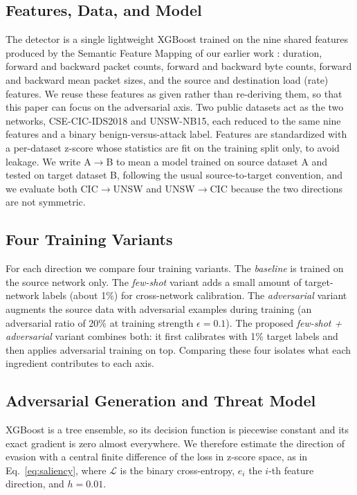 \documentclass[11pt,a4paper]{article}
\begin{document}
\subsection{Features, Data, and Model}
The detector is a single lightweight XGBoost \cite{xgboost} trained on the nine shared
features produced by the Semantic Feature Mapping of our earlier work
\cite{martono2024sfm}: duration, forward and backward packet counts, forward and backward
byte counts, forward and backward mean packet sizes, and the source and destination load
(rate) features. We reuse these features as given rather than re-deriving them, so that
this paper can focus on the adversarial axis. Two public datasets act as the two networks,
CSE-CIC-IDS2018 and UNSW-NB15, each reduced to the same nine features and a binary
benign-versus-attack label. Features are standardized with a per-dataset z-score whose
statistics are fit on the training split only, to avoid leakage. We write
A$\rightarrow$B to mean a model trained on source dataset A and tested on target dataset
B, following the usual source-to-target convention, and we evaluate both
CIC$\rightarrow$UNSW and UNSW$\rightarrow$CIC because the two directions are not symmetric.

\subsection{Four Training Variants}
For each direction we compare four training variants. The \emph{baseline} is trained on
the source network only. The \emph{few-shot} variant adds a small amount of
target-network labels (about 1\%) for cross-network calibration. The \emph{adversarial}
variant augments the source data with adversarial examples during training (an
adversarial ratio of 20\% at training strength $\epsilon=0.1$). The proposed
\emph{few-shot + adversarial} variant combines both: it first calibrates with 1\% target
labels and then applies adversarial training on top. Comparing these four isolates what
each ingredient contributes to each axis.

\subsection{Adversarial Generation and Threat Model}
XGBoost is a tree ensemble, so its decision function is piecewise constant and its exact
gradient is zero almost everywhere. We therefore estimate the direction of evasion with a
central finite difference of the loss in z-score space, as in Eq.~\eqref{eq:saliency},
where $\mathcal{L}$ is the binary cross-entropy, $e_i$ the $i$-th feature direction, and
$h=0.01$.
\end{document}
